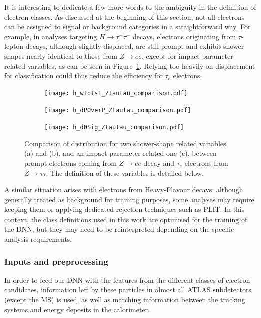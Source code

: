 It is interesting to dedicate a few more words to the ambiguity in the definition of electron classes. As discussed at the beginning of this section, not all electrons can be assigned to signal or background categories in a straightforward way. For example, in analyses targeting $H \rightarrow \tau^+\tau^-$ decays, electrons originating from $\tau$-lepton decays, although slightly displaced, are still prompt and exhibit shower shapes nearly identical to those from $Z \rightarrow ee$, except for impact parameter-related variables, as can be seen in Figure~\ref{fig:compare}. Relying too heavily on displacement for classification could thus reduce the efficiency for $\tau_e$ electrons. 
\begin{figure}[htbp]
  \centering
  \begin{subfigure}[b]{0.33\textwidth}
      \texttt{[image: h\_wtots1\_Ztautau\_comparison.pdf]}
      \caption{}
  \end{subfigure}
  \hfill
  \begin{subfigure}[b]{0.33\textwidth}
      \texttt{[image: h\_dPOverP\_Ztautau\_comparison.pdf]}
      \caption{}
  \end{subfigure}
  \hfill
  \begin{subfigure}[b]{0.33\textwidth}
      \texttt{[image: h\_d0Sig\_Ztautau\_comparison.pdf]}
      \caption{}
  \end{subfigure}
  \caption{Comparison of distribution for two shower-shape related variables (a) and (b), and an impact parameter related one (c), between prompt electrons coming from $Z \rightarrow ee$ decay and $\tau_{e}$ electrons from $Z \rightarrow \tau \tau$. The definition of these variables is detailed below. }
  \label{fig:compare}
\end{figure}
A similar situation arises with electrons from Heavy-Flavour decays: although generally treated as background for training purposes, some analyses may require keeping them or applying dedicated rejection techniques such as PLIT. In this context, the class definitions used in this work are optimised for the training of the DNN, but they may need to be reinterpreted depending on the specific analysis requirements.


\subsubsection{Inputs and preprocessing}
In order to feed our DNN with the features from the different classes of electron candidates, information left by these particles in almost all ATLAS subdetectors (except the MS) is used, as well as matching information between the tracking systems and energy deposits in the calorimeter. 

